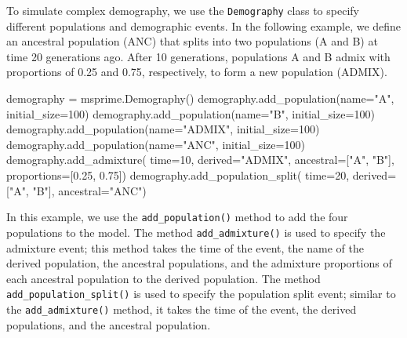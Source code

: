 \documentclass[graybox]{svmult}
\begin{document}

\label{Complex-demography}
To simulate complex demography, we use the \texttt{Demography} class to specify different
populations and demographic events. In the following example, we define
an ancestral population (ANC) that splits into two populations (A and B) at time
20 generations ago. After 10 generations, populations A and B admix with proportions of 0.25
and 0.75, respectively, to form a new population (ADMIX).

\begin{pythoncode}
    demography = msprime.Demography()
    demography.add_population(name="A", initial_size=100)
    demography.add_population(name="B", initial_size=100)
    demography.add_population(name="ADMIX", initial_size=100)
    demography.add_population(name="ANC", initial_size=100)
    demography.add_admixture(
        time=10, derived="ADMIX", ancestral=["A", "B"],
        proportions=[0.25, 0.75])
    demography.add_population_split(
        time=20, derived=["A", "B"], ancestral="ANC")
\end{pythoncode}

In this example, we use the \texttt{add\_population()} method to add the four populations
to the model. The method \texttt{add\_admixture()} is used to specify the admixture event;
this method takes the time of the event, the name of the derived population, the ancestral
populations, and the admixture proportions of each ancestral population to the derived population.
The method \texttt{add\_population\_split()} is used to specify the population split event;
similar to the \texttt{add\_admixture()} method, it takes the time of the event, the derived
populations, and the ancestral population.
\end{document}
